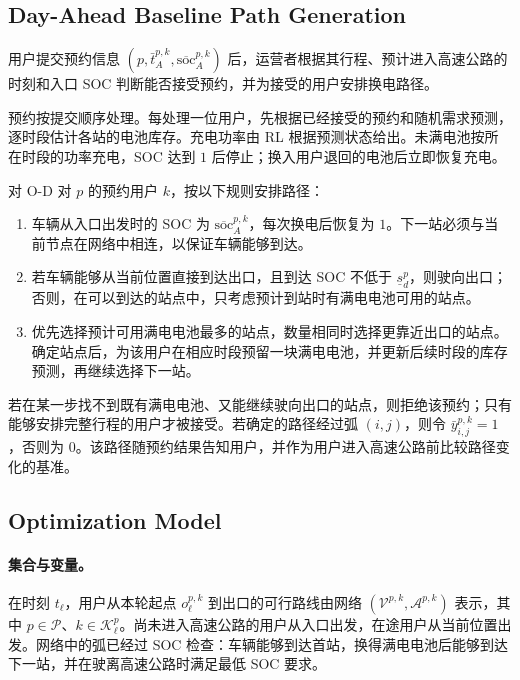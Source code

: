 \documentclass[12pt,a4paper,UTF8]{ctexart}
\begin{document}
\subsection{Day-Ahead Baseline Path Generation}

用户提交预约信息
$\left(p,\bar t_A^{p,k},\overline{\mathrm{soc}}_A^{p,k}\right)$
后，运营者根据其行程、预计进入高速公路的时刻和入口 SOC 判断能否接受预约，并为接受的用户安排换电路径。

预约按提交顺序处理。每处理一位用户，先根据已经接受的预约和随机需求预测，逐时段估计各站的电池库存。充电功率由 RL 根据预测状态给出。未满电池按所在时段的功率充电，SOC 达到 $1$ 后停止；换入用户退回的电池后立即恢复充电。

对 O-D 对 $p$ 的预约用户 $k$，按以下规则安排路径：
\begin{enumerate}
  \item 车辆从入口出发时的 SOC 为 $\overline{\mathrm{soc}}_A^{p,k}$，每次换电后恢复为 $1$。下一站必须与当前节点在网络中相连，以保证车辆能够到达。
  \item 若车辆能够从当前位置直接到达出口，且到达 SOC 不低于 $\underline s_d^p$，则驶向出口；否则，在可以到达的站点中，只考虑预计到站时有满电电池可用的站点。
  \item 优先选择预计可用满电电池最多的站点，数量相同时选择更靠近出口的站点。确定站点后，为该用户在相应时段预留一块满电电池，并更新后续时段的库存预测，再继续选择下一站。
\end{enumerate}

若在某一步找不到既有满电电池、又能继续驶向出口的站点，则拒绝该预约；只有能够安排完整行程的用户才被接受。若确定的路径经过弧 $(i,j)$，则令 $\bar y_{i,j}^{p,k}=1$，否则为 $0$。该路径随预约结果告知用户，并作为用户进入高速公路前比较路径变化的基准。


\subsection{Optimization Model}

\paragraph{集合与变量。}
在时刻 $t_\ell$，用户从本轮起点 $o_\ell^{p,k}$ 到出口的可行路线由网络 $(\mathcal V^{p,k},\mathcal A^{p,k})$ 表示，其中 $p\in\mathcal P$、$k\in\mathcal K_\ell^p$。尚未进入高速公路的用户从入口出发，在途用户从当前位置出发。网络中的弧已经过 SOC 检查：车辆能够到达首站，换得满电电池后能够到达下一站，并在驶离高速公路时满足最低 SOC 要求。
\end{document}
